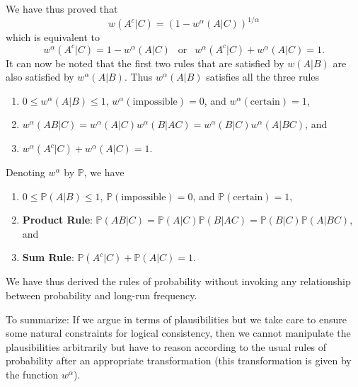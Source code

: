 \documentclass{scrartcl}
\renewcommand{\P}{{\mathbb P}}
\begin{document}
We have thus proved that
\begin{equation*}
  w(A^c|C) = \left(1 - w^{\alpha}(A|C) \right)^{1/\alpha} 
\end{equation*}
which is equivalent to
\begin{equation*}
  w^{\alpha}(A^c|C) = 1 - w^{\alpha}(A|C) ~~ \text{ or } ~~
  w^{\alpha}(A^c|C) + w^{\alpha}(A|C) = 1. 
\end{equation*}
It can now be noted that the first two rules that are satisfied by
$w(A|B)$ are also satisfied by $w^{\alpha}(A|B)$. Thus
$w^{\alpha}(A|B)$ satisfies all the three rules 
\begin{enumerate}
\item $0 \leq w^{\alpha}(A|B) \leq 1$,  $w^{\alpha}(\text{impossible}) = 0$, and
  $w^{\alpha}(\text{certain}) = 1$, 
\item $w^{\alpha}(AB|C) = w^{\alpha}(A|C) w^{\alpha}(B|AC) =
  w^{\alpha}(B|C) w^{\alpha}(A|BC)$, and
\item $w^{\alpha}(A^c|C) + w^{\alpha}(A|C) = 1$. 
\end{enumerate}
Denoting $w^{\alpha}$ by $\P$, we have
\begin{enumerate}
\item $0 \leq \P(A|B) \leq 1$,  $\P(\text{impossible}) = 0$, and
  $\P(\text{certain}) = 1$, 
\item \textbf{Product Rule}: $\P(AB|C) = \P(A|C) \P(B|AC) =
\P(B|C) \P(A|BC)$, and
\item \textbf{Sum Rule}: $\P(A^c|C) + \P(A|C) = 1$. 
\end{enumerate}
We have thus derived the rules of probability without invoking any
relationship between probability and long-run frequency.   

To summarize: If we argue in terms of plausibilities but we take care
to ensure some natural constraints for logical consistency, then we
cannot manipulate the plausibilities arbitrarily but have to reason
according to the usual rules of probability after an appropriate
transformation (this transformation is given by the function
$w^{\alpha}$).
\end{document}
